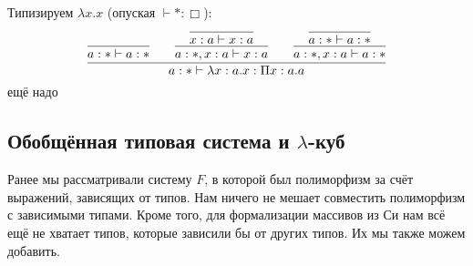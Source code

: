 \begin{example} Типизируем $\lambda x . x$ (опуская $\vdash * : \Box$):
\[
    \infer{a : * \vdash \lambda x : a . x : \Pi x : a . a}
        { \infer{a : * \vdash a : *}{}
        &&\infer{a : *, x : a \vdash x : a}{\infer{x : a \vdash x : a}{}}
        &&\infer{a : *, x : a \vdash a : *}{\infer{a : * \vdash a : *}{}}
        }
\]
\todo ещё надо
\end{example}

\subsection{\texorpdfstring{Обобщённая типовая система и $\lambda$-куб}{Generalized type system and lambda cube}}

Ранее мы рассматривали систему $F$, в которой был полиморфизм за счёт выражений, зависящих от типов.
Нам ничего не мешает совместить полиморфизм с зависимыми типами.
Кроме того, для формализации массивов из Си нам всё ещё не хватает типов, которые зависили бы от других типов.
Их мы также можем добавить.

